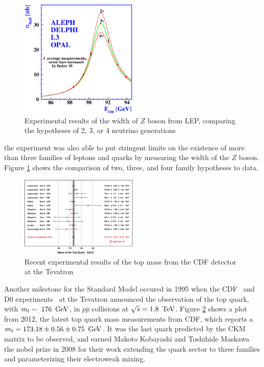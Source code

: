 \begin{figure}[h]
   \centering
  \includegraphics[width=0.5\textwidth]{Figures/Experimental_Results/Nnu.eps}
  \caption{Experimental results of the width of $Z$ boson from LEP, comparing the hypotheses of
    2, 3, or 4 neutrino generations} \label{fig:lep_Z_3_families}
\end{figure}

\noindent the experiment was also able to put stringent limits on the
existence of more than three families of leptons and quarks by
measuring the width of the $Z$ boson.  Figure
\ref{fig:lep_Z_3_families} shows the comparison of two, three, and
four family hypotheses to data.   

\begin{figure}[h]
   \centering
  \includegraphics[width=0.5\textwidth]{Figures/Experimental_Results/top_mass_tevatron_2012.eps}
  \caption{Recent experimental results of the top mass from the CDF detector at the Tevatron} \label{fig:topMass_CDF}
\end{figure}

\par Another milestone for the Standard Model occured in 1995 when the
CDF~\cite{ex:CDF_topQuark} and D0 experiments~\cite{ex:D0_topQuark} at
the Tevatron announced the observation of the top quark, with
$m_{t}\sim~176~\,\text{Ge\hspace{-.08em}V}$, in $p\bar{p}$ collisions at $\sqrt{s}=1.8~\,\text{Te\hspace{-.08em}V}$.
Figure \ref{fig:topMass_CDF} shows a plot from 2012, the latest top quark mass measurements
from CDF, which reports a $m_{t} = 173.18 \pm 0.56 \pm 0.75~\,\text{Ge\hspace{-.08em}V}$. It was the  
last quark predicted by the CKM matrix to be observed, and earned
Makoto Kobayashi and Toshihide Maskawa the nobel prize in 2008 for
their work extending the quark sector to three families and
parameterizing their electroweak mixing.   

